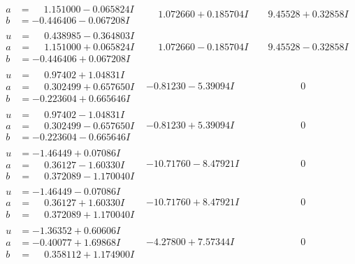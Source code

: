 \documentclass[1p]{elsarticle_modified}
\theoremstyle{definition}
\begin{document}
$$\begin{array}{c|c|c}
\begin{aligned}
a &= \phantom{-}1.151000 - 0.065824 I \\
b &= -0.446406 - 0.067208 I\end{aligned}
 & \phantom{-}1.072660 + 0.185704 I & \phantom{-}9.45528 + 0.32858 I \\ \hline\begin{aligned}
u &= \phantom{-}0.438985 - 0.364803 I \\
a &= \phantom{-}1.151000 + 0.065824 I \\
b &= -0.446406 + 0.067208 I\end{aligned}
 & \phantom{-}1.072660 - 0.185704 I & \phantom{-}9.45528 - 0.32858 I \\ \hline\begin{aligned}
u &= \phantom{-}0.97402 + 1.04831 I \\
a &= \phantom{-}0.302499 + 0.657650 I \\
b &= -0.223604 + 0.665646 I\end{aligned}
 & -0.81230 - 5.39094 I & \phantom{-0.000000 } 0 \\ \hline\begin{aligned}
u &= \phantom{-}0.97402 - 1.04831 I \\
a &= \phantom{-}0.302499 - 0.657650 I \\
b &= -0.223604 - 0.665646 I\end{aligned}
 & -0.81230 + 5.39094 I & \phantom{-0.000000 } 0 \\ \hline\begin{aligned}
u &= -1.46449 + 0.07086 I \\
a &= \phantom{-}0.36127 - 1.60330 I \\
b &= \phantom{-}0.372089 - 1.170040 I\end{aligned}
 & -10.71760 - 8.47921 I & \phantom{-0.000000 } 0 \\ \hline\begin{aligned}
u &= -1.46449 - 0.07086 I \\
a &= \phantom{-}0.36127 + 1.60330 I \\
b &= \phantom{-}0.372089 + 1.170040 I\end{aligned}
 & -10.71760 + 8.47921 I & \phantom{-0.000000 } 0 \\ \hline\begin{aligned}
u &= -1.36352 + 0.60606 I \\
a &= -0.40077 + 1.69868 I \\
b &= \phantom{-}0.358112 + 1.174900 I\end{aligned}
 & -4.27800 + 7.57344 I & \phantom{-0.000000 } 0 \\ \hline\begin{aligned}

\end{aligned}
\end{array}$$
\end{document}
